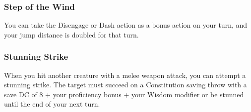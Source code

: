 \subsubsection{Step of the Wind} \label{mtec::stepofthewind}
You can take the Disengage or Dash action as a bonus action on your turn, and your jump distance is doubled for that turn.

\subsubsection{Stunning Strike} \label{mtec::stunningstrike}
When you hit another creature with a melee weapon attack, you can attempt a stunning strike.
The target must succeed on a Constitution saving throw with a save DC of 8 + your proficiency bonus + your Wisdom modifier or be stunned until the end of your next turn.
